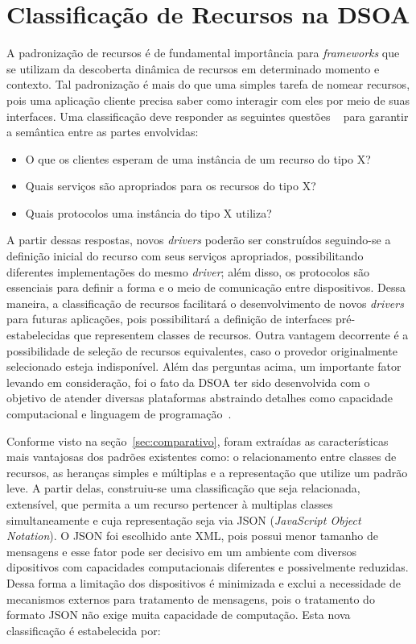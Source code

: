 \chapter{Classificação de Recursos na DSOA}

A padronização de recursos é de fundamental importância para \emph{frameworks} que se utilizam da descoberta dinâmica de recursos em determinado momento e contexto. Tal padronização é mais do que uma simples tarefa de nomear recursos, pois uma aplicação cliente precisa saber como interagir com eles por meio de suas interfaces. Uma classificação deve responder as seguintes questões ~\cite{pervasiveComputing} para garantir a semântica entre as partes envolvidas:

\begin{itemize}
	\item O que os clientes esperam de uma instância de um recurso do tipo X?

	\item Quais serviços são apropriados para os recursos do tipo X?

	\item Quais protocolos uma instância do tipo X utiliza?
\end{itemize}

A partir dessas respostas, novos \emph{drivers} poderão ser construídos seguindo-se a definição inicial do recurso com seus serviços apropriados, possibilitando diferentes implementações do mesmo \emph{driver}; além disso, os protocolos são essenciais para definir a forma e o meio de comunicação entre dispositivos. Dessa maneira, a classificação de recursos facilitará o desenvolvimento de novos \emph{drivers} para futuras aplicações, pois possibilitará a definição de interfaces pré-estabelecidas que representem classes de recursos. Outra vantagem decorrente é a possibilidade de seleção de recursos equivalentes, caso o provedor originalmente selecionado esteja indisponível. Além das perguntas acima, um importante fator levando em consideração, foi o fato da DSOA ter sido desenvolvida com o objetivo de atender diversas plataformas abstraindo detalhes como capacidade computacional e linguagem de programação~\cite{buzetoDSOA2010}.

Conforme visto na seção~\ref{sec:comparativo}, foram extraídas as características mais vantajosas dos padrões existentes como: o relacionamento entre classes de recursos, as heranças simples e múltiplas e a representação que utilize um padrão leve. A partir delas, construiu-se uma classificação que seja relacionada, extensível, que permita a um recurso pertencer à multiplas classes simultaneamente e cuja representação seja via JSON (\emph{JavaScript Object Notation}). O JSON foi escolhido ante XML, pois possui menor tamanho de mensagens e esse fator pode ser decisivo em um ambiente com diversos dipositivos com capacidades computacionais diferentes e possivelmente reduzidas. Dessa forma a limitação dos dispositivos é minimizada e exclui a necessidade de mecanismos externos para tratamento de mensagens, pois o tratamento do formato JSON não exige muita capacidade de computação. Esta nova classificação é estabelecida por:

